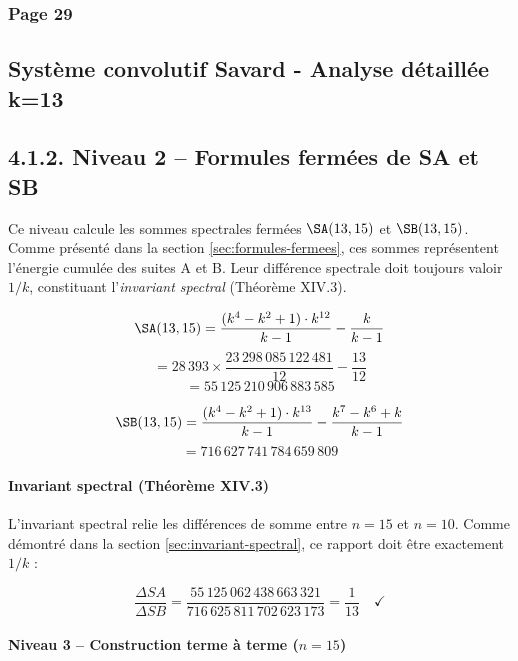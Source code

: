 \subsubsection*{Page 29}
\subsection*{Système convolutif Savard - Analyse détaillée k=13}

\subsection*{4.1.2. Niveau 2 -- Formules fermées de SA et SB}

Ce niveau calcule les sommes spectrales fermées $\SA(13,15)$ et $\SB(13,15)$. Comme présenté dans la section \ref{sec:formules-fermees}, ces sommes représentent l'énergie cumulée des suites A et B. Leur différence spectrale doit toujours valoir $1/k$, constituant l'\emph{invariant spectral} (Théorème XIV.3).

\begin{boitecalc}[Calcul de $\SA(13, 15)$]
$$\SA(13, 15) = \frac{(k^{4}-k^{2}+1) \cdot k^{12}}{k-1} - \frac{k}{k-1}$$
$$= 28\,393 \times \frac{23\,298\,085\,122\,481}{12} - \frac{13}{12}$$
$$\boxed{= 55\,125\,210\,906\,883\,585}$$
\end{boitecalc}

\begin{boitecalc}[Calcul de $\SB(13, 15)$]
$$\SB(13, 15) = \frac{(k^{4}-k^{2}+1) \cdot k^{13}}{k-1} - \frac{k^{7}-k^{6}+k}{k-1}$$
$$\boxed{= 716\,627\,741\,784\,659\,809}$$
\end{boitecalc}

\vspace{0.3cm}

\paragraph{Invariant spectral (Théorème XIV.3)}

L'invariant spectral relie les différences de somme entre $n=15$ et $n=10$. Comme démontré dans la section \ref{sec:invariant-spectral}, ce rapport doit être exactement $1/k$ :

$$\frac{\Delta SA}{\Delta SB} = \frac{55\,125\,062\,438\,663\,321}{716\,625\,811\,702\,623\,173} = \frac{1}{13} \quad \checkmark$$

\vspace{0.3cm}

\paragraph{Niveau 3 -- Construction terme à terme ($n = 15$)}

